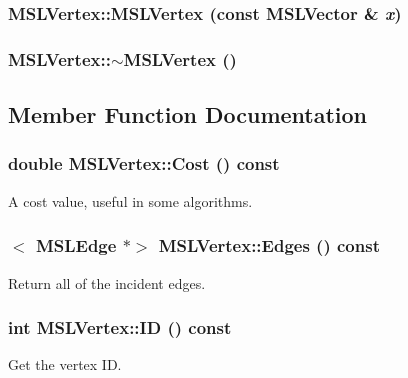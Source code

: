 \subsubsection{\setlength{\rightskip}{0pt plus 5cm}MSLVertex::MSLVertex (const {\bf MSLVector} \& {\em x})}\label{classMSLVertex_a10}


\subsubsection{\setlength{\rightskip}{0pt plus 5cm}MSLVertex::$\sim$MSLVertex ()}\label{classMSLVertex_a11}




\subsection{Member Function Documentation}
\subsubsection{\setlength{\rightskip}{0pt plus 5cm}double MSLVertex::Cost () const\hspace{0.3cm}{\tt  [inline]}}\label{classMSLVertex_a2}


A cost value, useful in some algorithms.

\subsubsection{$<$ {\bf MSLEdge} $\ast$$>$ MSLVertex::Edges () const\hspace{0.3cm}{\tt  [inline]}}\label{classMSLVertex_a1}


Return all of the incident edges.

\subsubsection{\setlength{\rightskip}{0pt plus 5cm}int MSLVertex::ID () const\hspace{0.3cm}{\tt  [inline]}}\label{classMSLVertex_a5}


Get the vertex ID.

